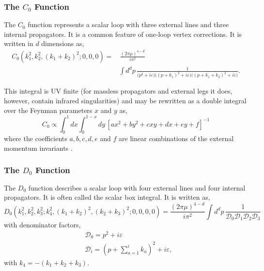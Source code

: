 \subsubsection{The $C_0$ Function}

The $C_0$ function represents a scalar loop with three external lines and three
internal propagators. It is a common feature of one-loop vertex corrections. It is written in $d$ dimensions as,
\begin{equation}
    \begin{split}
        C_0\!\left(k_1^2,k_2^2,(k_1+k_2)^2;0,0,0\right)=&\,\frac{(2\pi\mu)^{4-d}}{i\pi^2}\\ &\int d^dp\,\frac1{\Big(p^2+i\varepsilon\Big)\Big((p+k_1)^2+i\varepsilon\Big)\Big((p+k_1+k_2)^2+i\varepsilon\Big)}.
    \end{split}
\end{equation}

This integral is UV finite (for massless propagators and external legs it does, however, contain infrared singularities) and may be rewritten as a double integral over the Feynman 
parameters $x$ and $y$ as,
\begin{equation}
    C_0\propto\int_0^1dx\int_0^{1-x}dy\,\left[ax^2+by^2+cxy+dx+ey+f\right]^{-1}
\end{equation}
where the coefficients $a, b, c, d, e$ and $f$ are linear combinations of the external 
momentum invariants \cite{tHooft:1978xw}.

\subsubsection{The $D_0$ Function}\label{subsubsec:D0}

The $D_0$ function describes a scalar loop with four external lines and four internal 
propagators. It is often called the scalar box integral. It is written as,
\begin{equation}
    D_0\!\left(k_1^2,k_2^2,k_3^2;k_4^2,(k_1+k_2)^2,(k_2+k_3)^2;0,0,0,0\right)=\frac{(2\pi\mu)^{4-d}}{i\pi^2}\int d^dp\,\frac1{\mathcal D_0\mathcal D_1\mathcal D_2\mathcal D_3}
\end{equation}
with denominator factors,
\begin{equation}
    \begin{split}
        &\mathcal D_0 = p^2+i\varepsilon\\
        &\mathcal D_i = \left(p+\sum_{a=1}^ik_a\right)^2+i\varepsilon,
    \end{split}
\end{equation}
with $k_4=-(k_1+k_2+k_3)$.

